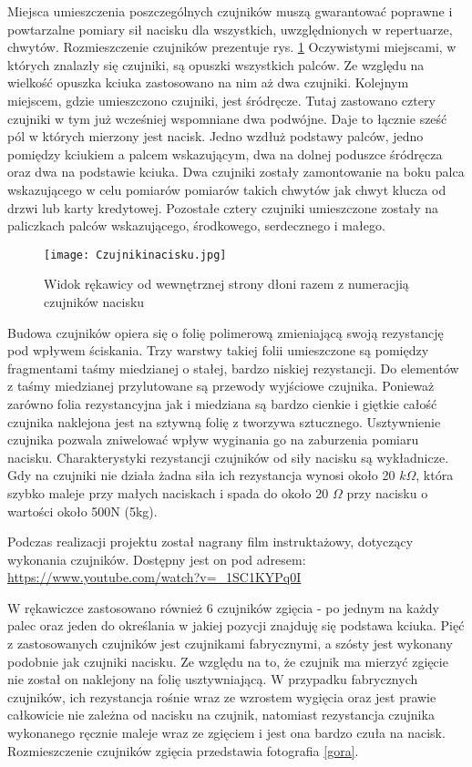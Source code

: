 \documentclass[10pt, a4paper]{article}
\begin{document}
Miejsca umieszczenia poszczególnych czujników muszą gwarantować poprawne i powtarzalne pomiary sił nacisku dla wszystkich, uwzględnionych w repertuarze, chwytów. Rozmieszczenie czujników prezentuje rys. \ref{dol}
Oczywistymi miejscami, w których znalazły się czujniki, są opuszki wszystkich palców. Ze względu na wielkość opuszka kciuka zastosowano na nim aż dwa czujniki. Kolejnym miejscem, gdzie umieszczono czujniki, jest śródręcze. Tutaj zastowano cztery czujniki w tym już wcześniej wspomniane dwa podwójne. Daje to łącznie sześć pól w których mierzony jest nacisk. Jedno wzdłuż podstawy palców, jedno pomiędzy kciukiem a palcem wskazującym, dwa na dolnej poduszce śródręcza oraz dwa na podstawie kciuka. Dwa czujniki zostały zamontowanie na boku palca wskazującego w celu pomiarów pomiarów takich chwytów jak chwyt klucza od drzwi lub karty kredytowej. Pozostałe cztery czujniki umieszczone zostały na paliczkach palców wskazującego, środkowego, serdecznego i małego.
	

\begin{figure}[h!]
\texttt{[image: Czujnikinacisku.jpg]}

\caption{Widok rękawicy od wewnętrznej strony dłoni razem z numeracjią czujników nacisku} \label{dol}
\end{figure}

\newpage


Budowa czujników opiera się o folię polimerową zmieniającą swoją rezystancję pod wpływem ściskania. Trzy warstwy takiej folii umieszczone są pomiędzy fragmentami taśmy miedzianej o stałej, bardzo niskiej rezystancji. Do elementów z taśmy miedzianej przylutowane są przewody wyjściowe czujnika. Ponieważ zarówno folia rezystancyjna jak i miedziana są bardzo cienkie i giętkie całość czujnika naklejona jest na sztywną folię z tworzywa sztucznego. Usztywnienie czujnika pozwala zniwelować wpływ wyginania go na zaburzenia pomiaru nacisku. Charakterystyki rezystancji czujników od siły nacisku są wykładnicze. Gdy na czujniki nie działa żadna siła ich rezystancja wynosi około 20 $k\Omega$, która szybko maleje przy małych naciskach i spada do około 20 $\Omega$ przy nacisku o wartości około 500N (5kg).

Podczas realizacji projektu został nagrany film instruktażowy, dotyczący wykonania czujników. Dostępny jest on pod adresem: \url{https://www.youtube.com/watch?v=_1SC1KYPq0I}

W rękawiczce zastosowano również 6 czujników zgięcia - po jednym na każdy palec oraz jeden do określania w jakiej pozycji znajduję się podstawa kciuka. Pięć z zastosowanych czujników jest czujnikami fabrycznymi, a szósty jest wykonany podobnie jak czujniki nacisku. Ze względu na to, że czujnik ma mierzyć zgięcie nie został on naklejony na folię usztywniającą. W przypadku fabrycznych czujników, ich rezystancja rośnie wraz ze wzrostem wygięcia oraz jest prawie całkowicie nie zależna od nacisku na czujnik, natomiast rezystancja czujnika wykonanego ręcznie maleje wraz ze zgięciem i jest ona bardzo czuła na nacisk. 
Rozmieszczenie czujników zgięcia przedstawia fotografia \ref{gora}.
\end{document}
